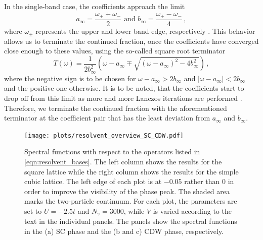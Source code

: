 \documentclass[
    reprint, 
    aps,
    preprintnumbers,
    twocolumn,
    prb,
    superscriptaddress
]{revtex4-2}
\begin{document}
In the single-band case, the coefficients approach the limit
\begin{equation}
    \label{eqn:inf_lanczos}
    a_\infty = \frac{\omega_+ + \omega_-}{2}\text{  and  } b_\infty = \frac{\omega_+ - \omega_-}{4}\,,
\end{equation}
where $\omega_\pm$ represents the upper and lower band edge, respectively \cite{PettiforRecursion}.
This behavior allows us to terminate the continued fraction, once the coefficients have converged close enough to these values, using the so-called square root terminator
\begin{equation}
    T(\omega) = \frac{1}{2b_\infty^2} \left( \omega - a_\infty \mp \sqrt{(\omega - a_\infty)^2 - 4 b_\infty^2} \right)\,,
\end{equation}
where the negative sign is to be chosen for $\omega - a_\infty > 2b_\infty$ and $|\omega - a_\infty| < 2b_\infty$ and the positive one otherwise.
It is to be noted, that the coefficients start to drop off from this limit as more and more Lanczos iterations are performed \cite{ViswanathRecursion}.
Therefore, we terminate the continued fraction with the aforementioned terminator at the coefficient pair that has the least deviation from $a_\infty$ and $b_\infty$.


\begin{figure}
    \centering
    \texttt{[image: plots/resolvent\_overview\_SC\_CDW.pdf]}
    \caption{Spectral functions with respect to the operators listed in \eqref{eqn:resolvent_bases}.
    The left column shows the results for the square lattice while the right column shows the results for the simple cubic lattice.
    The left edge of each plot is at $-0.05$ rather than $0$ in order to improve the visibility of the phase peak.
    The shaded area marks the two-particle continuum.
    For each plot, the parameters are set to $U=-2.5t$ and $N_\gamma = 3000$, while $V$ is varied according to the text in the individual panels.
    The panels show the spectral functions in the (a) SC phase and the (b and c) CDW phase, respectively.}
    \label{fig:resolvent_overview_SC}
\end{figure}
\end{document}
